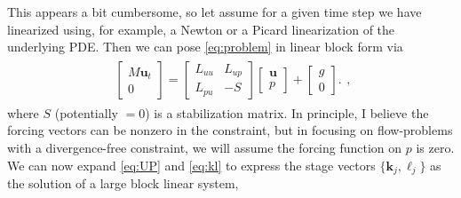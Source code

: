 \documentclass[a4paper,10pt]{article}
\begin{document}
This appears a bit cumbersome, so let assume for a given time step we have
linearized using, for example, a Newton or a Picard linearization of the
underlying PDE. Then we can pose \eqref{eq:problem} in linear block form
via
%
\begin{align}\label{eq:problem2}
\begin{split}
\begin{bmatrix} M \mathbf{u}_t \\ 0 \end{bmatrix}
	= \begin{bmatrix} L_{uu} & L_{up} \\ L_{pu} & -S \end{bmatrix}
	\begin{bmatrix} \mathbf{u} \\ p \end{bmatrix} + 
	\begin{bmatrix} g \\ 0 \end{bmatrix}.
\end{split},
\end{align}
%
where $S$ (potentially $= 0$) is a stabilization matrix.
In principle, I believe the forcing vectors can be nonzero in the constraint,
but in focusing on flow-problems with a divergence-free
constraint, we will assume the forcing function on $p$ is zero. We can
now expand \eqref{eq:UP} and \eqref{eq:kl} to express the stage vectors
$\{\mathbf{k}_j, \ell_j\}$ as the solution of a large block linear system,
%
\end{document}
